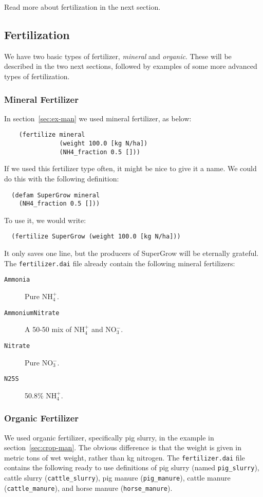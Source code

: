 \documentclass[a4paper,11pt]{article}
\begin{document}
Read more about fertilization in the next section.

\subsection{Fertilization}
\label{sec:fertilizer}

We have two basic types of fertilizer, \emph{mineral} and
\emph{organic}.  These will be described in the two next sections,
followed by examples of some more advanced types of fertilization. 

\subsubsection{Mineral Fertilizer}

In section~\ref{sec:ex-man} we used mineral fertilizer, as below:
\begin{verbatim}
    (fertilize mineral
               (weight 100.0 [kg N/ha])
               (NH4_fraction 0.5 []))
\end{verbatim}
If we used this fertilizer type often, it might be nice to give it a
name.  We could do this with the following definition:
\begin{verbatim}
  (defam SuperGrow mineral
    (NH4_fraction 0.5 []))
\end{verbatim}
To use it, we would write:
\begin{verbatim}
  (fertilize SuperGrow (weight 100.0 [kg N/ha]))
\end{verbatim}
It only saves one line, but the producers of SuperGrow\texttrademark{}
will be eternally grateful.  The \texttt{fertilizer.dai} file already
contain the following mineral fertilizers:
\begin{description}
\item[\texttt{Ammonia}] Pure NH$_4^+$.
\item[\texttt{AmmoniumNitrate}] A 50-50 mix of NH$_4^+$ and NO$_3^-$.
\item[\texttt{Nitrate}] Pure NO$_3^-$.
\item[\texttt{N25S}] 50.8\% NH$_4^+$.
\end{description}

\subsubsection{Organic Fertilizer}

We used organic fertilizer, specifically pig slurry, in the example in
section~\ref{sec:crop-man}.  The obvious difference is that the weight
is given in metric tons of wet weight, rather than kg nitrogen.  The
\texttt{fertilizer.dai} file contains the following ready to use
definitions of pig slurry (named \texttt{pig\_slurry}), cattle slurry
(\texttt{cattle\_slurry}), pig manure (\texttt{pig\_manure}), cattle
manure (\texttt{cattle\_manure}), and horse manure
(\texttt{horse\_manure}).
\end{document}
